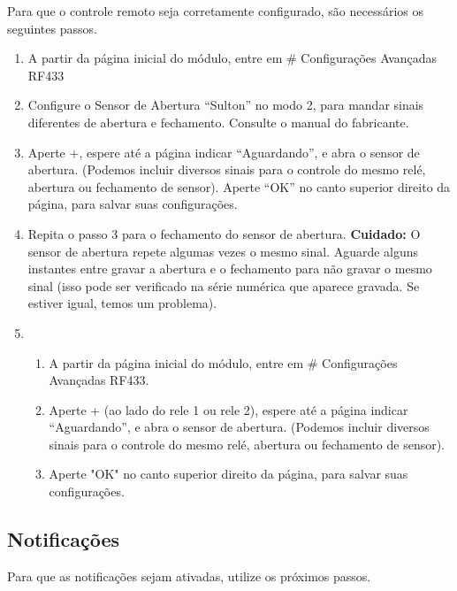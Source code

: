 Para que o controle remoto seja corretamente configurado, são necessários os seguintes passos.
\begin{enumerate}
    \item
    A partir da página inicial do módulo, entre em \# \textrightarrow{} Configurações Avançadas \textrightarrow{} RF433

    \item
    Configure o Sensor de Abertura “Sulton” no modo 2, para mandar sinais diferentes de abertura e fechamento. Consulte o manual do fabricante.

    \item
    Aperte +, espere até a página indicar “Aguardando”, e abra o sensor de abertura. (Podemos incluir diversos sinais para o controle do mesmo relé, abertura ou fechamento de sensor). Aperte “OK” no canto superior direito da página, para salvar suas configurações.

    \item
    Repita o passo 3 para o fechamento do sensor de abertura. \textbf{Cuidado:} O sensor de abertura repete algumas vezes o mesmo sinal. Aguarde alguns instantes entre gravar a abertura e o fechamento para não gravar o mesmo sinal (isso pode ser verificado na série numérica que aparece gravada. Se estiver igual, temos um problema).

    \item
        \begin{enumerate}
            \item
            A partir da página inicial do módulo, entre em \# \textrightarrow{} Configurações Avançadas \textrightarrow{} RF433.

            \item
            Aperte + (ao lado do rele 1 ou rele 2), espere até a página indicar “Aguardando”, e abra o sensor de abertura. (Podemos incluir diversos sinais para o controle do mesmo relé, abertura ou fechamento de sensor).

            \item
            Aperte "OK" no canto superior direito da página, para salvar suas configurações.
            
        \end{enumerate}
\end{enumerate}

\subsection{Notificações}
Para que as notificações sejam ativadas, utilize os próximos passos.

